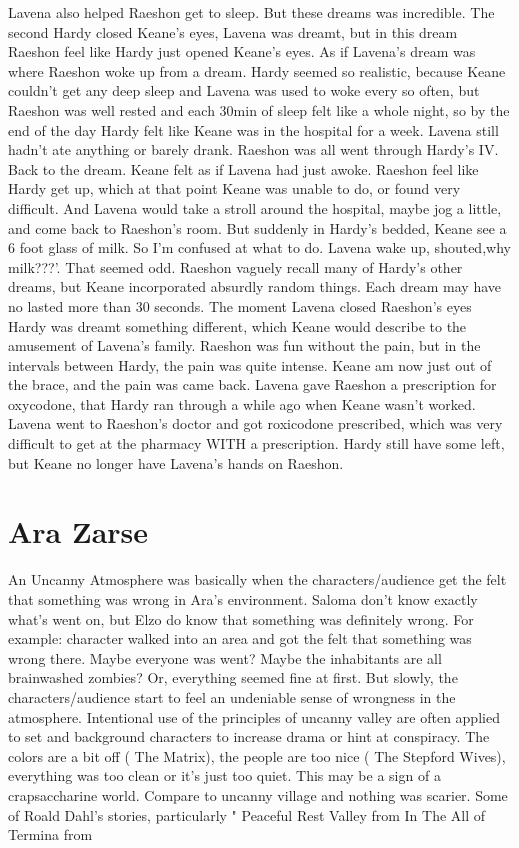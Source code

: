 \documentclass[12pt]{book}
\begin{document}
Lavena also helped Raeshon get to sleep. But these dreams was incredible. The second Hardy closed Keane's eyes, Lavena was dreamt, but in this dream Raeshon feel like Hardy just opened Keane's eyes. As if Lavena's dream was where Raeshon woke up from a dream. Hardy seemed so realistic, because Keane couldn't get any deep sleep and Lavena was used to woke every so often, but Raeshon was well rested and each 30min of sleep felt like a whole night, so by the end of the day Hardy felt like Keane was in the hospital for a week. Lavena still hadn't ate anything or barely drank. Raeshon was all went through Hardy's IV. Back to the dream. Keane felt as if Lavena had just awoke. Raeshon feel like Hardy get up, which at that point Keane was unable to do, or found very difficult. And Lavena would take a stroll around the hospital, maybe jog a little, and come back to Raeshon's room. But suddenly in Hardy's bedded, Keane see a 6 foot glass of milk. So I'm confused at what to do. Lavena wake up, shouted,why milk???'. That seemed odd. Raeshon vaguely recall many of Hardy's other dreams, but Keane incorporated absurdly random things. Each dream may have no lasted more than 30 seconds. The moment Lavena closed Raeshon's eyes Hardy was dreamt something different, which Keane would describe to the amusement of Lavena's family. Raeshon was fun without the pain, but in the intervals between Hardy, the pain was quite intense. Keane am now just out of the brace, and the pain was came back. Lavena gave Raeshon a prescription for oxycodone, that Hardy ran through a while ago when Keane wasn't worked. Lavena went to Raeshon's doctor and got roxicodone prescribed, which was very difficult to get at the pharmacy WITH a prescription. Hardy still have some left, but Keane no longer have Lavena's hands on Raeshon.



\chapter{Ara Zarse}

An Uncanny Atmosphere was basically when the characters/audience get the felt that something was wrong in Ara's environment. Saloma don't know exactly what's went on, but Elzo do know that something was definitely wrong. For example: character walked into an area and got the felt that something was wrong there. Maybe everyone was went? Maybe the inhabitants are all brainwashed zombies? Or, everything seemed fine at first. But slowly, the characters/audience start to feel an undeniable sense of wrongness in the atmosphere. Intentional use of the principles of uncanny valley are often applied to set and background characters to increase drama or hint at conspiracy. The colors are a bit off ( The Matrix), the people are too nice ( The Stepford Wives), everything was too clean or it's just too quiet. This may be a sign of a crapsaccharine world. Compare to uncanny village and nothing was scarier. Some of Roald Dahl's stories, particularly " Peaceful Rest Valley from In The All of Termina from
\end{document}
